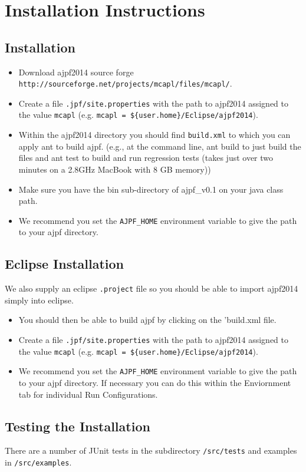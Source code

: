 \chapter{Installation Instructions}
\label{chap:installation}
\section{Installation}

\begin{itemize}
\item Download ajpf2014 source forge \texttt{http://sourceforge.net/projects/mcapl/files/mcapl/}.
\item Create a file \texttt{.jpf/site.properties} with the path to ajpf2014 assigned to the value \texttt{mcapl} (e.g. \texttt{mcapl = \$\{user.home\}/Eclipse/ajpf2014}).
\item Within the ajpf2014 directory you should find \texttt{build.xml} to which you can apply ant to build ajpf. (e.g., at the command line, ant build to just build the files and ant test to build and run regression tests (takes just over two minutes on a 2.8GHz MacBook with 8 GB memory))
\item Make sure you have the bin sub-directory of ajpf\_v0.1 on your java class path.
\item We recommend you set the \texttt{AJPF\_HOME} environment variable to give the path to your ajpf directory.
\end{itemize}

\section{Eclipse Installation}

We also supply an eclipse \texttt{.project} file so you should be able to import ajpf2014 simply into eclipse.
\begin{itemize}
\item You should then be able to build ajpf by clicking on the 'build.xml file.
\item Create a file \texttt{.jpf/site.properties} with the path to ajpf2014 assigned to the value \texttt{mcapl} (e.g. \texttt{mcapl = \$\{user.home\}/Eclipse/ajpf2014}).
\item We recommend you set the \texttt{AJPF\_HOME} environment variable to give the path to your ajpf directory.  If necessary you can do this within the Enviornment tab for individual Run Configurations.
\end{itemize}

\section{Testing the Installation}

There are a number of JUnit tests in the subdirectory \texttt{/src/tests} and examples in \texttt{/src/examples}.

